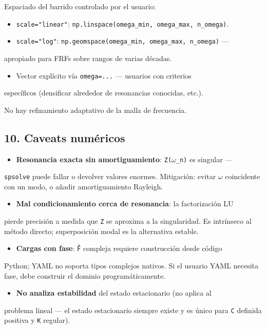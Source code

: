 \documentclass[11pt,letterpaper,oneside]{report}
\begin{document}
Espaciado del barrido controlado por el usuario:

\begin{itemize}
  \item \texttt{scale="linear"}: \texttt{np.linspace(omega\_min, omega\_max, n\_omega)}.
  \item \texttt{scale="log"}: \texttt{np.geomspace(omega\_min, omega\_max, n\_omega)} ---
\end{itemize}
  apropiado para FRFs sobre rangos de varias décadas.
\begin{itemize}
  \item Vector explícito vía \texttt{omega=...} --- usuarios con criterios
\end{itemize}
  específicos (densificar alrededor de resonancias conocidas, etc.).

No hay refinamiento adaptativo de la malla de frecuencia.

\subsection{10. Caveats numéricos}

\begin{itemize}
  \item \textbf{Resonancia exacta sin amortiguamiento}: \texttt{Z(\ensuremath{\omega}\_n)} es singular ---
\end{itemize}
  \texttt{spsolve} puede fallar o devolver valores enormes. Mitigación:
  evitar \texttt{\ensuremath{\omega}} coincidente con un modo, o añadir amortiguamiento
  Rayleigh.
\begin{itemize}
  \item \textbf{Mal condicionamiento cerca de resonancia}: la factorización LU
\end{itemize}
  pierde precisión a medida que \texttt{Z} se aproxima a la singularidad. Es
  intrínseco al método directo; superposición modal es la alternativa
  estable.
\begin{itemize}
  \item \textbf{Cargas con fase}: \texttt{F̂} compleja requiere construcción desde código
\end{itemize}
  Python; YAML no soporta tipos complejos nativos. Si el usuario YAML
  necesita fase, debe construir el dominio programáticamente.
\begin{itemize}
  \item \textbf{No analiza estabilidad} del estado estacionario (no aplica al
\end{itemize}
  problema lineal --- el estado estacionario siempre existe y es único
  para \texttt{C} definida positiva y \texttt{K} regular).
\end{document}

